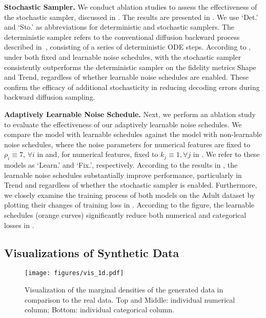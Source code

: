 \textbf{Stochastic Sampler.}
We conduct ablation studies to assess the effectiveness of the stochastic sampler, discussed in . The results are presented in . We use `Det.' and `Sto.' as abbreviations for deterministic and stochastic samplers. The deterministic sampler refers to the conventional diffusion backward process described in~\citet{vp, edm}, consisting of a series of deterministic ODE steps. According to , under both fixed and learnable noise schedules, \method with the stochastic sampler consistently outperforms the deterministic sampler on the fidelity metrics Shape and Trend, regardless of whether learnable noise schedules are enabled. These confirm the efficacy of additional stochasticity in reducing decoding errors during backward diffusion sampling.

\textbf{Adaptively Learnable Noise Schedule.} Next, we perform an ablation study to evaluate the effectiveness of our adaptively learnable noise schedules. We compare the model with learnable schedules against the model with non-learnable noise schedules, where the noise parameters for numerical features are fixed to $\rho_i\equiv7, \, \forall i$ in  and, for numerical features, fixed to $k_j\equiv1, \forall j$ in . We refer to these models as `Learn.' and `Fix.', respectively. According to the results in , the learnable noise schedules substantially improve performance, particularly in Trend and regardless of whether the stochastic sampler is enabled. Furthermore, we closely examine the training process of both models on the Adult dataset by plotting their changes of training loss in . According to the figure, the learnable schedules (orange curves) significantly reduce both numerical and categorical losses in .


\subsection{Visualizations of Synthetic Data}
\begin{figure}[t]
    \centering
    \texttt{[image: figures/vis\_1d.pdf]}
    \caption{Visualization of the marginal densities of the generated data in comparison to the real data. Top and Middle: individual numerical column; Bottom: individual categorical column.} 
    \vspace{-10pt}
    \label{fig:1d}
\end{figure}

